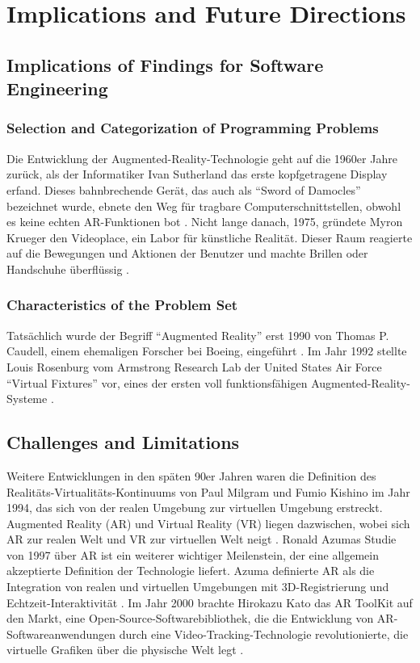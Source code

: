 
\section{Implications and Future Directions}

\subsection{Implications of Findings for Software Engineering}

\subsubsection{Selection and Categorization of Programming Problems}

Die Entwicklung der Augmented-Reality-Technologie geht auf die 1960er Jahre zurück, als der Informatiker Ivan Sutherland das erste kopfgetragene Display erfand. Dieses bahnbrechende Gerät, das auch als “Sword of Damocles” bezeichnet wurde, ebnete den Weg für tragbare Computerschnittstellen, obwohl es keine echten AR-Funktionen bot \cite{Sutherland1968AHT}. Nicht lange danach, 1975, gründete Myron Krueger den Videoplace, ein Labor für künstliche Realität. Dieser Raum reagierte auf die Bewegungen und Aktionen der Benutzer und machte Brillen oder Handschuhe überflüssig \cite{Videoplace}.

\subsubsection{Characteristics of the Problem Set}

Tatsächlich wurde der Begriff “Augmented Reality” erst 1990 von Thomas P. Caudell, einem ehemaligen Forscher bei Boeing, eingeführt \cite{Lee2012AugmentedRI}. Im Jahr 1992 stellte Louis Rosenburg vom Armstrong Research Lab der United States Air Force “Virtual Fixtures” vor, eines der ersten voll funktionsfähigen Augmented-Reality-Systeme \cite{rosenberg1992use}.

\subsection{Challenges and Limitations}

Weitere Entwicklungen in den späten 90er Jahren waren die Definition des Realitäts-Virtualitäts-Kontinuums von Paul Milgram und Fumio Kishino im Jahr 1994, das sich von der realen Umgebung zur virtuellen Umgebung erstreckt. Augmented Reality (AR) und Virtual Reality (VR) liegen dazwischen, wobei sich AR zur realen Welt und VR zur virtuellen Welt neigt  \cite{Milgram94a}. Ronald Azumas Studie von 1997 über AR ist ein weiterer wichtiger Meilenstein, der eine allgemein akzeptierte Definition der Technologie liefert. Azuma definierte AR als die Integration von realen und virtuellen Umgebungen mit 3D-Registrierung und Echtzeit-Interaktivität \cite{Azuma1997ASO}. Im Jahr 2000 brachte Hirokazu Kato das AR ToolKit auf den Markt, eine Open-Source-Softwarebibliothek, die die Entwicklung von AR-Softwareanwendungen durch eine Video-Tracking-Technologie revolutionierte, die virtuelle Grafiken über die physische Welt legt \cite{ARTooLKIT}.

